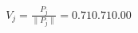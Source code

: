 \documentclass[preview]{standalone}
\begin{document}
\begin{align*}
V_j=\frac{P_j}{\|P_j\|}=  0.71 0.71 0.00
\end{align*}
\end{document}
